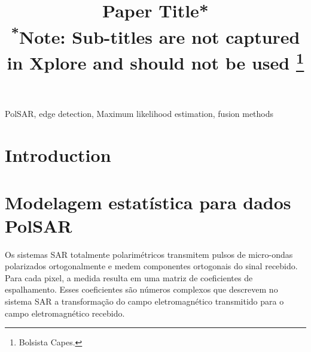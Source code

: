 \documentclass[conference]{IEEEtran}
\begin{document}
\title{Paper Title*\\
{\footnotesize \textsuperscript{*}Note: Sub-titles are not captured in Xplore and
should not be used}
\thanks{Bolsista Capes.}
}

\author{
\and
{}
\and
{}
}

\maketitle

\begin{abstract}

\end{abstract}

\begin{IEEEkeywords}
PolSAR, edge detection, Maximum likelihood estimation, fusion methods
\end{IEEEkeywords}

\section{Introduction}
\section{Modelagem estatística para dados PolSAR}
Os sistemas SAR totalmente polarimétricos transmitem pulsos de micro-ondas polarizados ortogonalmente e medem componentes ortogonais do sinal recebido. Para cada pixel, a medida resulta em uma matriz de coeficientes de espalhamento. Esses coeficientes são números complexos que descrevem no sistema SAR a transformação do campo eletromagnético transmitido para o campo eletromagnético recebido.
\end{document}
